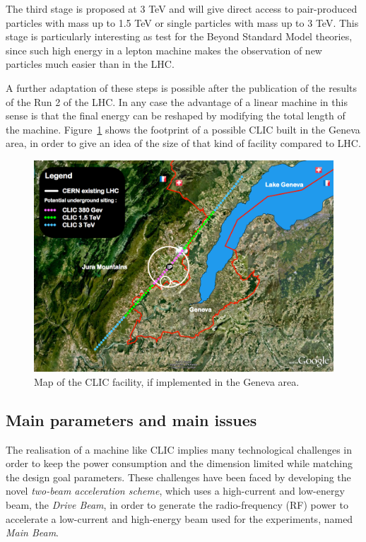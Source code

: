 The third stage is proposed at 3 TeV and will give direct access to pair-produced particles with mass up to 1.5 TeV or single particles with mass up to 3 TeV. This stage is particularly interesting as test for the Beyond Standard Model theories, since such high energy in a lepton machine makes the observation of new particles much easier than in the LHC.

A further adaptation of these steps is possible after the publication of the results of the Run 2 of the LHC. In any case the advantage of a linear machine in this sense is that the final energy can be reshaped by modifying the total length of the machine. Figure~\ref{CLIC_map} shows the footprint of a possible CLIC built in the Geneva area, in order to give an idea of the size of that kind of facility compared to LHC.

\begin{figure}[h]
\centering

\includegraphics[scale=0.3]{pictures/CLIC_map}
\caption{Map of the CLIC facility, if implemented in the Geneva area.}
\label{CLIC_map}

\end{figure}


\subsection{Main parameters and main issues}

The realisation of a machine like CLIC implies many technological challenges in order to keep the power consumption and the dimension limited while matching the design goal parameters. These challenges have been faced by developing the novel \textit{two-beam acceleration scheme}, which uses a high-current and low-energy beam, the \textit{Drive Beam}, in order to generate the radio-frequency (RF) power to accelerate a low-current and high-energy beam used for the experiments, named \textit{Main Beam}. 

